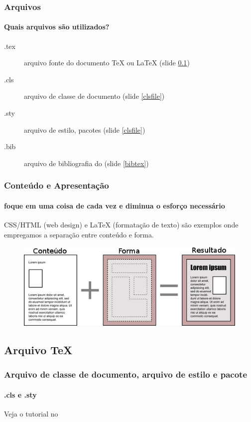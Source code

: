 \begin{frame}
\frametitle{Arquivos}
\framesubtitle{Quais arquivos são utilizados?}
\begin{description}
\item[.tex] arquivo fonte do documento \TeX{} ou \LaTeX{} (slide \ref{sec:tex})
\item[.cls] arquivo de classe de documento (slide \ref{clsfile})
\item[.sty] arquivo de estilo, pacotes (slide \ref{clsfile})
\item[.bib] arquivo de bibliografia do \BibTeX{} (slide \ref{bibtex})
\end{description}
\end{frame}

\begin{frame}
\frametitle{Conteúdo e Apresentação}
\framesubtitle{foque em uma coisa de cada vez e diminua o esforço necessário}
  CSS/HTML (web design) e \LaTeX{} (formatação de texto) são exemplos onde empregamos a separação entre conteúdo e forma.
  \begin{figure}[h!]
  \centering
  \includegraphics[width=\textwidth]{figures/content_design.png}
  \label{fig:content_design}
  \end{figure}
\end{frame}



\subsection{Arquivo \TeX{}}\label{sec:tex}



\begin{frame}[label={clsfile}]
\frametitle{Arquivo de classe de documento, arquivo de estilo e pacote}
\framesubtitle{.cls e .sty}
Veja o tutorial no  
\end{frame}
